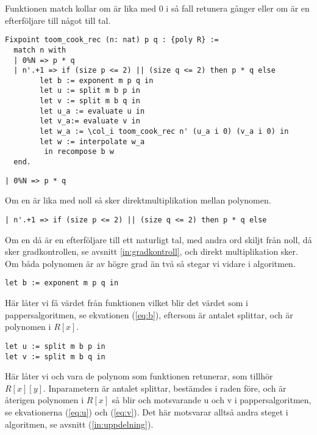 Funktionen match kollar om  är lika med 0 i så fall retunera  gånger
 eller om  är en efterföljare till något till tal.

\begin{lstlisting}
Fixpoint toom_cook_rec (n: nat) p q : {poly R} :=
  match n with
  | 0%N => p * q
  | n'.+1 => if (size p <= 2) || (size q <= 2) then p * q else
        let b := exponent m p q in
        let u := split m b p in
        let v := split m b q in
        let u_a := evaluate u in
        let v_a:= evaluate v in
        let w_a := \col_i toom_cook_rec n' (u_a i 0) (v_a i 0) in
        let w := interpolate w_a
         in recompose b w
  end.
\end{lstlisting}

\begin{lstlisting}
| 0%N => p * q
\end{lstlisting}

Om en  är lika med noll så sker direktmultiplikation mellan polynomen.

\begin{lstlisting}
| n'.+1 => if (size p <= 2) || (size q <= 2) then p * q else
\end{lstlisting}

Om en  då är en efterföljare till ett naturligt tal, med andra ord skiljt
från noll, då sker gradkontrollen, se avsnitt \ref{in:gradkontroll}, och direkt
multiplikation sker. Om båda polynomen är av högre grad än två så stegar vi
vidare i algoritmen.

\begin{lstlisting}
let b := exponent m p q in
\end{lstlisting}

Här låter vi  få värdet från funktionen  vilket blir det
värdet som i pappersalgoritmen, se ekvationen (\ref{eq:b}), eftersom  är
antalet splittar,  och  är polynomen i $R[x]$.

\begin{lstlisting}
let u := split m b p in
let v := split m b q in
\end{lstlisting}

Här låter vi  och  vara de polynom som funktionen 
retunerar, som tillhör $R[x][y]$. Inparametern  är antalet splittar, 
bestämdes i raden före,  och  är återigen polynomen i $R[x]$ så blir 
 och  motsvarande u och v i pappersalgoritmen, se ekvationerna
(\ref{eq:u}) och (\ref{eq:v}). Det här motsvarar alltså andra steget i
algoritmen, se avsnitt (\ref{in:uppdelning}).

